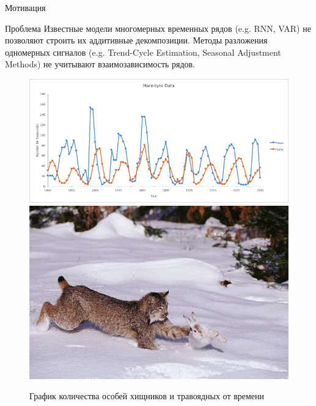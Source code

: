 	\begin{frame}{Мотивация}
		
		\begin{alertblock}{Проблема}
			Известные модели многомерных временных рядов (e.g. RNN, VAR) не позволяют строить их аддитивные декомпозиции. Методы разложения одномерных сигналов (e.g. Trend-Cycle Estimation, Seasonal Adjustment Methods) не учитывают взаимозависимость рядов.
		\end{alertblock}
		
		\begin{figure}[h]
			\centering
			
			\includegraphics[width=0.69\textheight, keepaspectratio]{img/prey_predetor_graph}
			\includegraphics[width=0.28\textheight, keepaspectratio]{img/hare-lynx.jpg}
			
			\caption{График количества особей хищников и травоядных от времени}
			
		\end{figure}
		
	\end{frame}
	
